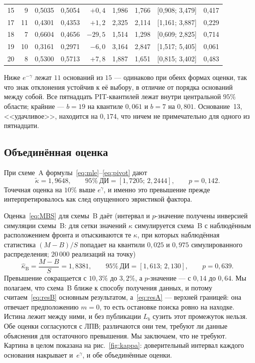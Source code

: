 \documentclass[11pt,a4paper]{article}
\theoremstyle{plain}
\theoremstyle{remark}
\newcommand{\eg}{e^{\gamma}}
\newcommand{\emg}{e^{-\gamma}}
\begin{document}
\begin{table}[t]
\begin{tabular}{rrrrrrrl r}
15 & 9 & 0{,}5035 & 0{,}5054 & $+0{,}4$ & 1{,}986 & 1{,}766 & [0{,}908; 3{,}479] & 0{,}417\\
17 & 11 & 0{,}4301 & 0{,}4353 & $+1{,}2$ & 2{,}325 & 2{,}114 & [1{,}161; 3{,}887] & 0{,}229\\
18 & 7 & 0{,}6604 & 0{,}4656 & $-29{,}5$ & 1{,}514 & 1{,}298 & [0{,}609; 2{,}825] & 0{,}714\\
19 & 10 & 0{,}3161 & 0{,}2971 & $-6{,}0$ & 3{,}164 & 2{,}847 & [1{,}517; 5{,}405] & 0{,}061\\
20 & 8 & 0{,}5300 & 0{,}5713 & $+7{,}8$ & 1{,}887 & 1{,}651 & [0{,}815; 3{,}402] & 0{,}483\\
\bottomrule
\end{tabular}
\end{table}

Ниже $\emg$ лежат $11$ оснований из $15$ --- одинаково при обеих формах оценки, так что
знак отклонения устойчив к её выбору, в отличие от порядка оснований между собой.
Все пятнадцать PIT-квантилей лежат внутри центральной $95\%$ области; крайние --- $b=19$
на квантиле $0{,}061$ и $b=7$ на $0{,}801$. Основание~13, <<удачливое>>, находится на
$0{,}174$, что ничем не примечательно для одного из пятнадцати.

\subsection{Объединённая оценка}\label{sec:pooled}

При схеме~A формулы~\eqref{eq:mle}--\eqref{eq:pivot} дают
\begin{equation}\label{eq:resA}
\tilde\kappa=1{,}9648,\qquad 95\%\ \text{ДИ}=[1{,}7205;\,2{,}2444],\qquad p=0{,}142 .
\end{equation}
Точечная оценка на $10\%$ выше $\eg$, и именно это превышение прежде интерпретировалось
как след опущенного эвристикой фактора.

Оценка~\eqref{eq:MBS} для схемы~B даёт (интервал и $p$-значение получены инверсией
симуляции схемы~B: для сетки значений $\kappa$ симулируется схема~B с наблюдённым
расположением фронта и отыскиваются те $\kappa$, при которых наблюдённая статистика
$(M-B)/S$ попадает на квантили $0{,}025$ и $0{,}975$ симулированного распределения;
$20\,000$ реализаций на точку)
\begin{equation}\label{eq:resB}
\hat\kappa_{\mathrm B}=\frac{M-B}{S}=1{,}8381,\qquad
95\%\ \text{ДИ}=[1{,}613;\,2{,}130],\qquad p=0{,}639 .
\end{equation}
Превышение сокращается с $10{,}3\%$ до $3{,}2\%$, а $p$-значение --- с $0{,}14$ до
$0{,}64$. Мы полагаем, что схема~B ближе к способу получения данных, и потому
считаем~\eqref{eq:resB} основным результатом, а~\eqref{eq:resA} --- верхней границей:
она отвечает предположению $m=0$, то есть остановке поиска ровно на находке.
Истина лежит между ними, и без публикации $L_b$ сузить этот промежуток нельзя.
Обе оценки согласуются с ЛПВ; различаются они тем, требуют ли данные объяснения
для остаточного превышения. Мы заключаем, что не требуют. Картина в целом показана
на рис.~\ref{fig:kappa}: доверительный интервал каждого основания накрывает
и~$\eg$, и обе объединённые оценки.
\end{document}
